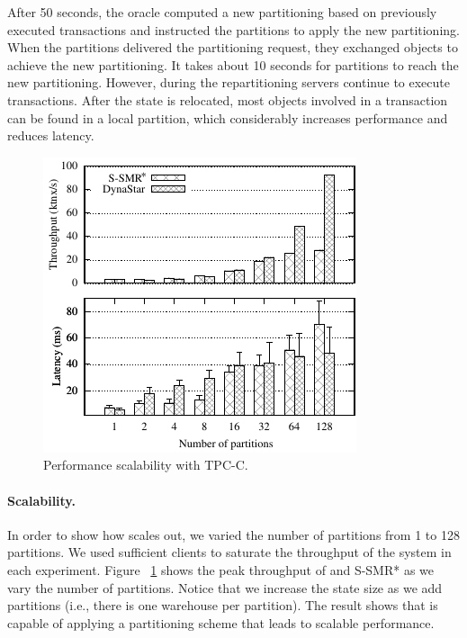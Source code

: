 
After 50 seconds, the oracle computed a new partitioning based on previously executed transactions 
and instructed the partitions to apply the new partitioning.
When the partitions delivered the partitioning request, they exchanged objects to achieve the new partitioning.
It takes about 10 seconds for partitions to reach the new partitioning.
However, during the repartitioning servers continue to execute transactions.
After the state is relocated, most objects involved in a transaction
can be found in a local partition, which considerably increases performance and reduces latency. 

\begin{figure}[ht!]
  \centering
    \includegraphics[width=0.95\columnwidth]{figures/experiments/tpcc-scaling-tp-lat.pdf}
  \caption{Performance scalability with TPC-C.}
  \label{fig:tpcc_scaling}
\end{figure}
\paragraph*{Scalability.}
In order to show how \dynastar scales out, we varied the number of partitions from 1 to 128 partitions. 
We used sufficient clients to  saturate the throughput of the system in each experiment. 
Figure ~\ref{fig:tpcc_scaling} shows the peak throughput of \dynastar and S-SMR* as we vary the 
number of partitions. 
Notice that we increase the state size as we add partitions (i.e., there is one warehouse per partition).
The result shows that \dynastar is capable of applying
a partitioning scheme that leads to scalable performance.


